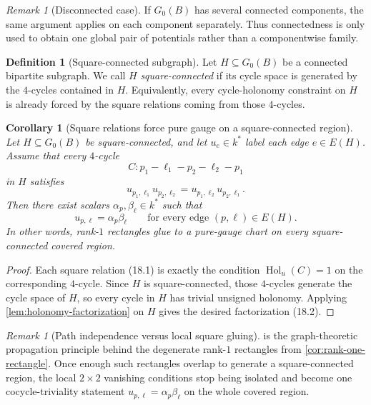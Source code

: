 \documentclass[11pt]{amsart}
\numberwithin{equation}{section}
\theoremstyle{plain}
\newtheorem{corollary}[theorem]{Corollary}
\theoremstyle{definition}
\newtheorem{definition}[theorem]{Definition}
\theoremstyle{remark}
\newtheorem{remark}[theorem]{Remark}
\begin{document}
\begin{remark}[Disconnected case]
If $G_0(B)$ has several connected components, the same argument applies on each component separately. Thus connectedness is only used to
obtain one global pair of potentials rather than a componentwise family.
\end{remark}

\begin{definition}[Square-connected subgraph]
\label{def:square-connected}
Let $H\subseteq G_0(B)$ be a connected bipartite subgraph. We call $H$ \emph{square-connected} if its cycle space is generated by the
$4$-cycles contained in $H$. Equivalently, every cycle-holonomy constraint on $H$ is already forced by the square relations coming from
those $4$-cycles.
\end{definition}

\begin{corollary}[Square relations force pure gauge on a square-connected region]
\label{cor:square-relations-pure-gauge}
Let $H\subseteq G_0(B)$ be square-connected, and let $u_e\in k^*$ label each edge $e\in E(H)$. Assume that every $4$-cycle
\[
C: p_1-\ell_1-p_2-\ell_2-p_1
\]
in $H$ satisfies
\[
u_{p_1,\ell_1}u_{p_2,\ell_2}=u_{p_1,\ell_2}u_{p_2,\ell_1}.
\tag{18.1}
\]
Then there exist scalars $\alpha_p,\beta_\ell\in k^*$ such that
\[
u_{p,\ell}=\alpha_p\beta_\ell
\qquad\text{for every edge }(p,\ell)\in E(H).
\tag{18.2}
\]
In other words, rank-$1$ rectangles glue to a pure-gauge chart on every square-connected covered region.
\end{corollary}

\begin{proof}
Each square relation \textup{(18.1)} is exactly the condition $\operatorname{Hol}_{u}(C)=1$ on the corresponding $4$-cycle. Since $H$ is
square-connected, those $4$-cycles generate the cycle space of $H$, so every cycle in $H$ has trivial unsigned holonomy. Applying
\cref{lem:holonomy-factorization} on $H$ gives the desired factorization \textup{(18.2)}.
\end{proof}

\begin{remark}[Path independence versus local square gluing]
\label{rem:path-independence-square-gluing}
 is the graph-theoretic propagation principle behind the degenerate rank-$1$ rectangles from
\cref{cor:rank-one-rectangle}. Once enough such rectangles overlap to generate a square-connected region, the local $2\times2$ vanishing
conditions stop being isolated and become one cocycle-triviality statement $u_{p,\ell}=\alpha_p\beta_\ell$ on the whole covered region.
\end{remark}
\end{document}
